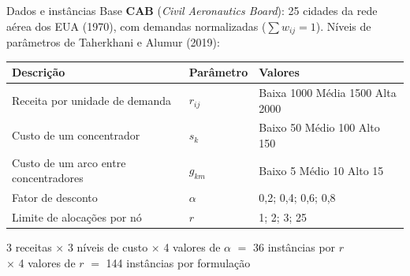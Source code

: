 \documentclass[aspectratio=169, 10pt]{beamer}
\begin{document}
\begin{frame}{Dados e instâncias}
  \small
  Base \textbf{CAB} (\textit{Civil Aeronautics Board}): 25 cidades da rede aérea dos EUA (1970), com demandas normalizadas ($\sum w_{ij}=1$). Níveis de parâmetros de Taherkhani e Alumur (2019):

  \begin{table}
    \centering
    \footnotesize
    \begin{tabular}{lll}
      \toprule
      Descrição & Parâmetro & Valores \\
      \midrule
      Receita por unidade de demanda & $r_{ij}$ & Baixa 1000 \quad Média 1500 \quad Alta 2000 \\
      Custo de um concentrador & $s_k$ & Baixo 50 \quad Médio 100 \quad Alto 150 \\
      Custo de um arco entre concentradores & $g_{km}$ & Baixo 5 \quad Médio 10 \quad Alto 15 \\
      Fator de desconto & $\alpha$ & 0,2; 0,4; 0,6; 0,8 \\
      Limite de alocações por nó & $r$ & 1; 2; 3; 25 \\
      \bottomrule
    \end{tabular}
  \end{table}

  \begin{center}
    3 receitas $\times$ 3 níveis de custo $\times$ 4 valores de $\alpha$ $=$ \alert{36 instâncias por $r$}\\
    $\times$ 4 valores de $r$ $=$ \alert{144 instâncias por formulação}
  \end{center}
\end{frame}
\end{document}
